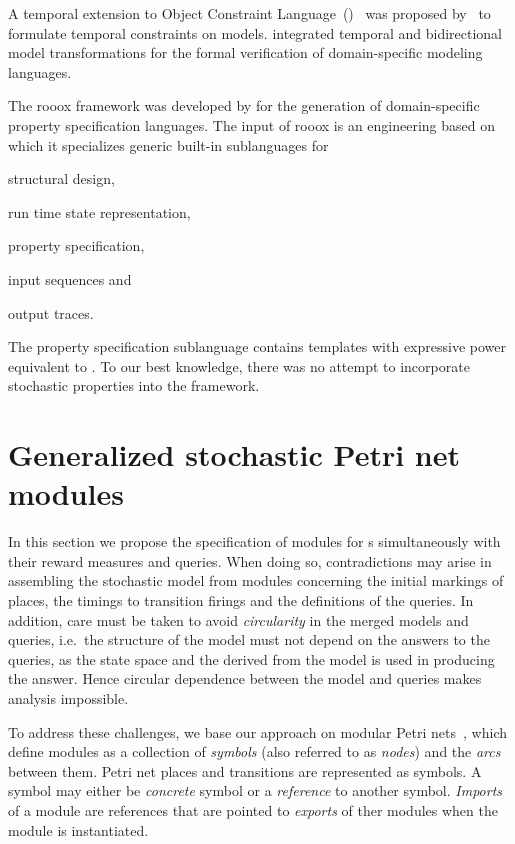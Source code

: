 A temporal extension to Object Constraint Language~()~\citep{OMG14ocl} was proposed by~\citet{Ziemann03temporal} to formulate temporal constraints on  models. \citet{Zalila13integration} integrated temporal  and bidirectional model transformations for the formal verification of domain-specific modeling languages.

The rooox framework was developed by \citet{Meyers14promobox} for the generation of domain-specific property specification languages. The input of rooox is an engineering  based on which it specializes generic built-in sublanguages for \begin{inparaenum}
\item structural design,
\item run time state representation,
\item property specification,
\item input sequences and
\item output traces.
\end{inparaenum}
The property specification sublanguage contains templates with expressive power equivalent to . To our best knowledge, there was no attempt to incorporate stochastic properties into the framework.

\section{Generalized stochastic Petri net modules}

In this section we propose the specification of modules for s simultaneously with their reward measures and queries. When doing so, contradictions may arise in assembling the stochastic model from modules concerning the initial markings of places, the timings to transition firings and the definitions of the queries. In addition, care must be taken to avoid \emph{circularity} in the merged models and queries, i.e.~the structure of the model must not depend on the answers to the queries, as the state space and the  derived from the model is used in producing the answer. Hence circular dependence between the model and queries makes analysis impossible.

To address these challenges, we base our approach on modular Petri nets~\citep{Kindler01modular}, which define modules as a collection of \emph{symbols} (also referred to as \emph{nodes}) and the \emph{arcs} between them. Petri net places and transitions are represented as symbols. A symbol may either be \emph{concrete} symbol or a \emph{reference} to another symbol. \emph{Imports} of a module are references that are pointed to \emph{exports} of ther modules when the module is instantiated.


